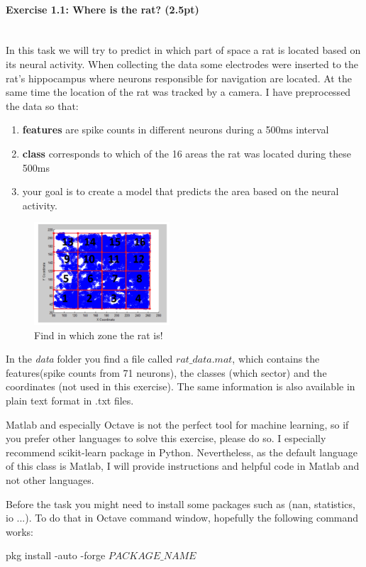 \documentclass[a4paper,11pt]{article}
\newenvironment{exercise}[3]{\paragraph{Exercise #1: #2 (#3pt)}\ \\}{
\medskip}
\begin{document}
\begin{exercise}{1.1}{Where is the rat?}{2.5}
In this task we will try to predict in which part of space a rat is located based on its neural activity. When collecting the data some electrodes were inserted to the rat's hippocampus where neurons responsible for navigation are located. At the same time the location of the rat was tracked by a camera. I have preprocessed the data so that:
\begin{enumerate}
\item \textbf{features} are spike counts in different neurons during a 500ms interval
\item \textbf{class} corresponds to which of the 16 areas the rat was located during these 500ms
\item your goal is to create a model that predicts the area based on the neural activity.
\end{enumerate}

\begin{figure}
	\centering
	\vspace{-5pt}
	\includegraphics[width=0.45\textwidth]{rat.png}
	\caption{Find in which zone the rat is!}
	\label{fig:rat}
	
\end{figure}

In the \emph{data} folder you find a file called \emph{$rat\_data.mat$}, which contains the features(spike counts from 71 neurons), the classes (which sector) and the coordinates (not used in this exercise). The same information is also available in plain text format in .txt files.

Matlab and especially Octave is not the perfect tool for machine learning, so if you prefer other languages to solve this exercise, please do so. I especially recommend scikit-learn package in Python. Nevertheless, as the default language of this class is Matlab, I will provide instructions and helpful code in Matlab and not other languages.

Before the task you might need to install some packages such as (nan, statistics, io ...). To do that in Octave command window, hopefully the following command works:\\
\begin{center}
pkg install -auto -forge $PACKAGE\_NAME$
\end{center} 



\end{exercise}
\end{document}
